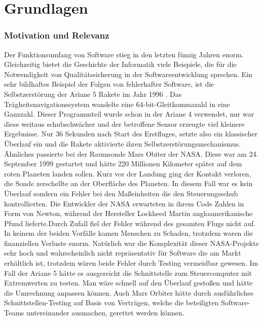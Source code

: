 \chapter{Grundlagen}
\label{sec:fundamentals}
\subsection{Motivation und Relevanz}

Der Funktionsumfang von Software stieg in den letzten fünzig Jahren enorm. Gleichzeitig bietet die Geschichte der Informatik viele Beispiele, die für die Notwendigkeit von Qualitätssicherung in der Softwareentwicklung sprechen. Ein sehr bildhaftes Beispiel der Folgen von fehlerhafter Software, ist die Selbstzerstörung der Ariane 5 Rakete im Jahr 1996 \cite{giese_warum_2002}. Das Trägheitsnavigationssystem wandelte eine 64-bit-Gleitkommazahl in eine Ganzzahl. Dieser Programmteil wurde schon in der Ariane 4 verwendet, nur war diese weitaus schubschwächer und der betroffene Sensor erzeugte viel kleinere Ergebnisse. Nur 36 Sekunden nach Start des Erstfluges, setzte also ein klassischer Überlauf ein und die Rakete aktivierte ihren Selbstzerstörungsmechanismus.
Ähnliches passierte bei der Raumsonde Mars Obiter der NASA. Diese war am 24. September 1999 gestartet und hätte 220 Millionen Kilometer später auf dem roten Planeten landen sollen. Kurz vor der Landung ging der Kontakt verloren, die Sonde zerschellte an der Oberfläche des Planeten. In diesem Fall war es kein Überlauf sondern ein Fehler bei den Maßeinheiten die den Steuerungsschub kontrollierten. Die Entwickler der NASA erwarteten in ihrem Code Zahlen in Form von Newton, während der Hersteller Lockheed Martin angloamerikanische Pfund lieferte.Durch Zufall fiel der Fehler während des gesamten Flugs nicht auf. \cite{thaller_software-test:_2002}
In keinem der beiden Vorfälle kamen Menschen zu Schaden, trotzdem waren die finanziellen Verluste enorm. Natürlich war die Komplexität dieser NASA-Projekte sehr hoch und wahrscheinlich nicht repräsentativ für Software die am Markt erhältlich ist, trotzdem wären beide Fehler durch Testing vermeidbar gewesen. Im Fall der Ariane 5 hätte es ausgereicht die Schnittstelle zum Steuercomputer mit Extremwerten zu testen. Man wäre schnell auf den Überlauf gestoßen und hätte die Umrechnung anpassen können. Auch Mars Orbiter hätte durch ausführliches Schnittstellen-Testing auf Basis von Verträgen, welche die beteiligten Software-Teams untereinander ausmachen, gerettet werden können.

